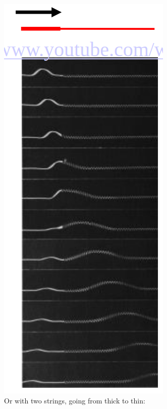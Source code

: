 \begin{figure}[H]
    \centering
    \includegraphics{figures/lec04-03.png}
     \caption{Or with two strings, going from thick to thin:
}
\end{figure}

